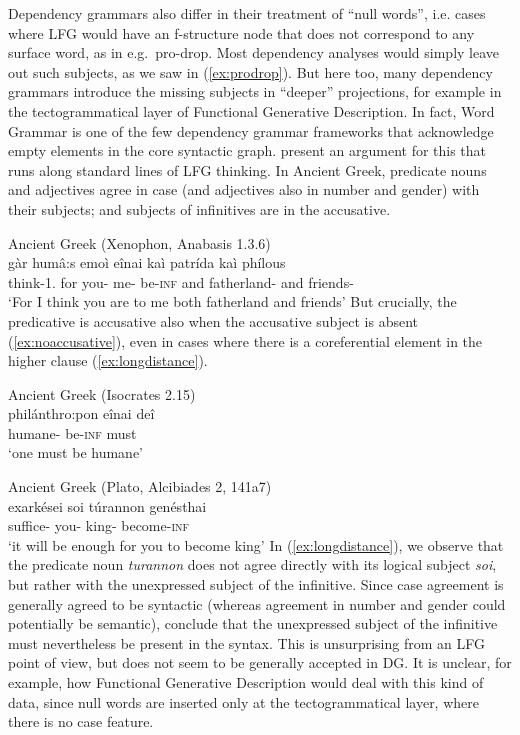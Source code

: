 \documentclass[output=paper,hidelinks]{langscibook}
\begin{document}
Dependency grammars also differ in their treatment of ``null words'',
i.e. cases where LFG would have an f-structure node that does not
correspond to any surface word, as in e.g.\ pro-drop. Most dependency
analyses would simply leave out such subjects, as we saw in (\ref{ex:prodrop}).
But here too, many dependency grammars introduce the missing subjects
in ``deeper'' projections, for example in the tectogrammatical layer
of Functional Generative Description. In fact, Word Grammar is one of
the few dependency grammar frameworks that acknowledge empty elements
in the core syntactic graph. \citet{CreiderHudson2006} present an argument for this
that runs along standard lines of LFG thinking. In Ancient Greek,
predicate nouns and adjectives agree in case (and adjectives also in number and
gender) with their subjects; and subjects of infinitives are in the
accusative.

\ea Ancient Greek (Xenophon, Anabasis 1.3.6)\\
 {gàr} {humâ:s}   emoì      eînai  kaì  patrída             kaì  phílous\\
{think-1.\PRS} {for}  {you-\ACC} {me-\DAT} {be-\textsc{inf}} and {fatherland-\ACC} and {friends-\ACC}\\
\glt `For I think you are to me both fatherland and friends'
\z
But crucially, the predicative is accusative also when the accusative subject is absent (\ref{ex:noaccusative}), even in cases where there is a coreferential element in the higher clause (\ref{ex:longdistance}).

\ea\label{ex:noaccusative} Ancient Greek (Isocrates 2.15)\\
\gll philánthro:pon eînai deî \\
{humane-\ACC} {be-\textsc{inf}} must\\
\glt `one must be humane' 
\z

\ea\label{ex:longdistance} Ancient Greek (Plato, Alcibiades 2, 141a7)\\
\gll exarkései        soi         túrannon  genésthai \\
{suffice-\FUT} {you-\DAT} {king-\ACC} {become-\textsc{inf}} \\
\glt `it will be enough for you to become king' 
\z
%
In (\ref{ex:longdistance}), we observe that the predicate noun \textit{turannon} does not agree directly with its logical subject \textit{soi}, but rather with the unexpressed subject of the infinitive.
Since case agreement is generally agreed to be syntactic (whereas
agreement in number and gender could potentially be semantic), \citet{CreiderHudson2006}
conclude that the unexpressed subject of the infinitive must
nevertheless be present in the syntax. This is unsurprising from an
LFG point of view, but does not seem to be generally accepted in
DG. It is unclear, for example, how Functional
Generative Description would deal with this kind of data, since null words are
inserted only at the tectogrammatical layer, where there is no case
feature.
\end{document}
